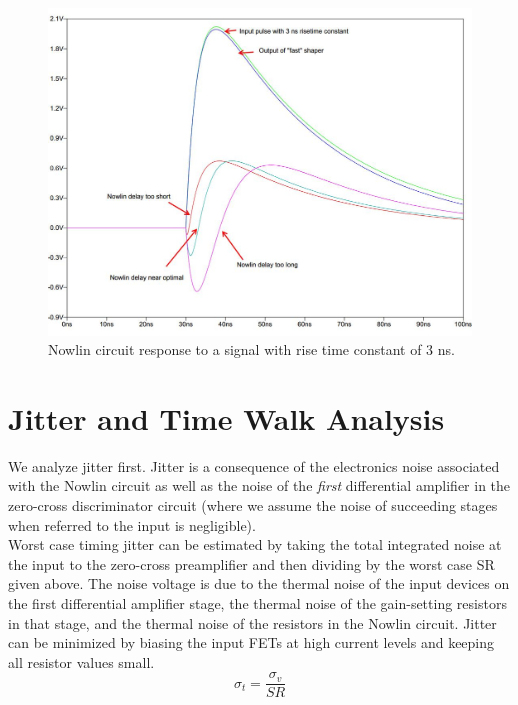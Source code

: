 \documentclass[12pt, onecolumn]{IEEEtran}
\begin{document}
\begin{figure}[htbp!]
	\centering
 	\includegraphics[scale=0.6,keepaspectratio=true]{./images/nowlin_response.jpg} 	
 	\caption{Nowlin circuit response to a signal with rise time constant of 3 ns.}
 	\label{FIG:NOWLIN_RESPONSE}
\end{figure}

\section*{Jitter and Time Walk Analysis}


We analyze jitter first.  Jitter is a consequence of the electronics noise associated with the Nowlin circuit as well as the noise of the \emph{first} differential amplifier in the zero-cross discriminator circuit (where we assume the noise of succeeding stages when referred to the input is negligible).\\


Worst case timing jitter can be estimated by taking the total integrated noise at the input to the zero-cross preamplifier and then dividing by the worst case SR given above.  The noise voltage is due to the thermal noise of the input devices on the first differential amplifier stage, the thermal noise of the gain-setting resistors in that stage, and the thermal noise of the resistors in the Nowlin circuit.  Jitter can be minimized by biasing the input FETs at high current levels and keeping all resistor values small.\\

\begin{equation*}
\sigma_t = \frac{\sigma_v}{SR}
\end{equation*}\\
\end{document}
